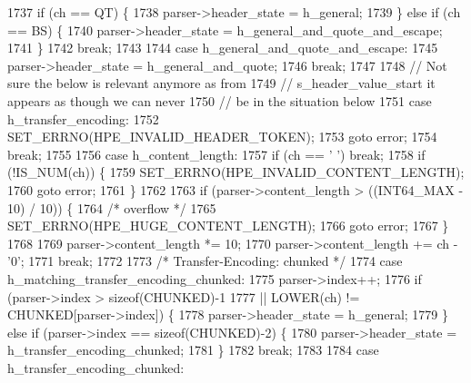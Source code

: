 \begin{DoxyCode}
1737             \textcolor{keywordflow}{if} (ch == QT) \{
1738               parser->header_state = h_general;
1739             \} \textcolor{keywordflow}{else} \textcolor{keywordflow}{if} (ch == BS) \{
1740               parser->header_state = h_general_and_quote_and_escape;
1741             \}
1742             \textcolor{keywordflow}{break};
1743 
1744           \textcolor{keywordflow}{case} h_general_and_quote_and_escape:
1745             parser->header_state = h_general_and_quote;
1746             \textcolor{keywordflow}{break};
1747 
1748           \textcolor{comment}{// Not sure the below is relevant anymore as from}
1749           \textcolor{comment}{// s\_header\_value\_start it appears as though we can never}
1750           \textcolor{comment}{// be in the situation below}
1751           \textcolor{keywordflow}{case} h_transfer_encoding:
1752             SET_ERRNO(HPE_INVALID_HEADER_TOKEN);
1753             \textcolor{keywordflow}{goto} error;
1754             \textcolor{keywordflow}{break};
1755 
1756           \textcolor{keywordflow}{case} h_content_length:
1757             \textcolor{keywordflow}{if} (ch == \textcolor{charliteral}{' '}) \textcolor{keywordflow}{break};
1758             \textcolor{keywordflow}{if} (!IS_NUM(ch)) \{
1759               SET_ERRNO(HPE_INVALID_CONTENT_LENGTH);
1760               \textcolor{keywordflow}{goto} error;
1761             \}
1762 
1763             \textcolor{keywordflow}{if} (parser->content_length > ((INT64\_MAX - 10) / 10)) \{
1764               \textcolor{comment}{/* overflow */}
1765               SET_ERRNO(HPE_HUGE_CONTENT_LENGTH);
1766               \textcolor{keywordflow}{goto} error;
1767             \}
1768 
1769             parser->content_length *= 10;
1770             parser->content_length += ch - \textcolor{charliteral}{'0'};
1771             \textcolor{keywordflow}{break};
1772 
1773           \textcolor{comment}{/* Transfer-Encoding: chunked */}
1774           \textcolor{keywordflow}{case} h_matching_transfer_encoding_chunked:
1775             parser->index++;
1776             \textcolor{keywordflow}{if} (parser->index > \textcolor{keyword}{sizeof}(CHUNKED)-1
1777                 || LOWER(ch) != CHUNKED[parser->index]) \{
1778               parser->header_state = h_general;
1779             \} \textcolor{keywordflow}{else} \textcolor{keywordflow}{if} (parser->index == \textcolor{keyword}{sizeof}(CHUNKED)-2) \{
1780               parser->header_state = h_transfer_encoding_chunked;
1781             \}
1782             \textcolor{keywordflow}{break};
1783 
1784           \textcolor{keywordflow}{case} h_transfer_encoding_chunked:

\end{DoxyCode}
